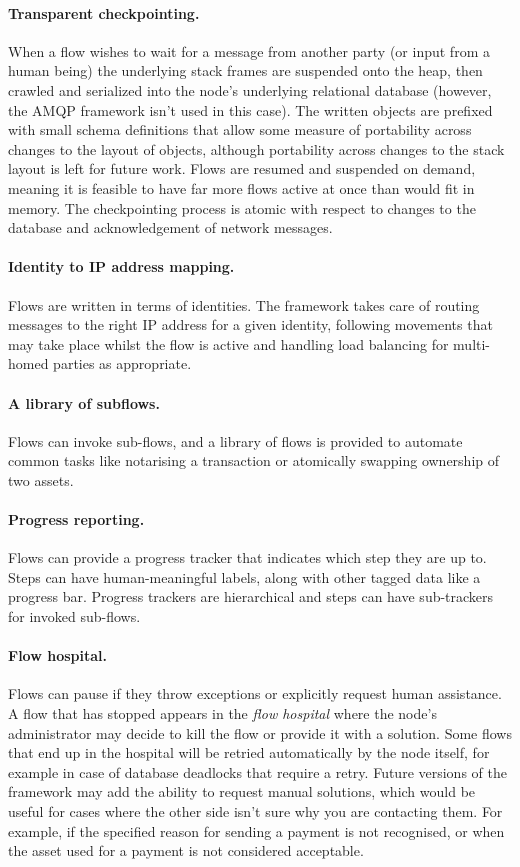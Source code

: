 \documentclass{article}
\begin{document}
\paragraph{Transparent checkpointing.}When a flow wishes to wait for a message from another party (or input from a
human being) the underlying stack frames are suspended onto the heap, then crawled and serialized into the node's
underlying relational database (however, the AMQP framework isn't used in this case). The written objects are
prefixed with small schema definitions that allow some measure of portability across changes to the layout of
objects, although portability across changes to the stack layout is left for future work. Flows are resumed and
suspended on demand, meaning it is feasible to have far more flows active at once than would fit in memory. The
checkpointing process is atomic with respect to changes to the database and acknowledgement of network messages.

\paragraph{Identity to IP address mapping.}Flows are written in terms of identities. The framework takes care of
routing messages to the right IP address for a given identity, following movements that may take place whilst the
flow is active and handling load balancing for multi-homed parties as appropriate.

\paragraph{A library of subflows.}Flows can invoke sub-flows, and a library of flows is provided to automate common
tasks like notarising a transaction or atomically swapping ownership of two assets.

\paragraph{Progress reporting.}Flows can provide a progress tracker that indicates which step they are up to. Steps
can have human-meaningful labels, along with other tagged data like a progress bar. Progress trackers are
hierarchical and steps can have sub-trackers for invoked sub-flows.

\paragraph{Flow hospital.}Flows can pause if they throw exceptions or explicitly request human assistance. A flow
that has stopped appears in the \emph{flow hospital} where the node's administrator may decide to kill the flow or
provide it with a solution. Some flows that end up in the hospital will be retried automatically by the node
itself, for example in case of database deadlocks that require a retry. Future versions of the framework may add
the ability to request manual solutions, which would be useful for cases where the other side isn't sure why
you are contacting them. For example, if the specified reason for sending a payment is not recognised, or
when the asset used for a payment is not considered acceptable.
\end{document}
